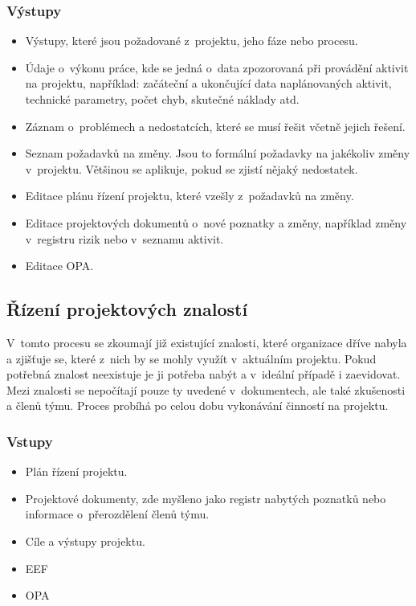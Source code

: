 \subsubsection*{Výstupy}
\begin{itemize}
    \item Výstupy, které jsou požadované z~projektu, jeho fáze nebo procesu.
    \item Údaje o~výkonu práce, kde se jedná o~data zpozorovaná při provádění aktivit na projektu, například: začáteční a ukončující data naplánovaných aktivit, technické parametry, počet chyb, skutečné náklady atd. 
    \item Záznam o~problémech a nedostatcích, které se musí řešit včetně jejich řešení.
    \item Seznam požadavků na změny. Jsou to formální požadavky na jakékoliv změny v~projektu. Většinou se aplikuje, pokud se zjistí nějaký nedostatek.
    \item Editace plánu řízení projektu, které vzešly z~požadavků na změny.
    \item Editace projektových dokumentů o~nové poznatky a změny, například změny v~registru rizik nebo v~seznamu aktivit.
    \item Editace OPA.
\end{itemize}

\subsection*{Řízení projektových znalostí}

V~tomto procesu se zkoumají již existující znalosti, které organizace dříve nabyla a zjišťuje se, které z~nich by se mohly využít v~aktuálním projektu. Pokud potřebná znalost neexistuje je ji potřeba nabýt a v~ideální případě i zaevidovat. Mezi znalosti se nepočítají pouze ty uvedené v~dokumentech, ale také zkušenosti a  členů týmu. Proces probíhá po celou dobu vykonávání činností na projektu.

\subsubsection*{Vstupy}
\begin{itemize}
    \item Plán řízení projektu.
    \item Projektové dokumenty, zde myšleno jako registr nabytých poznatků nebo informace o~přerozdělení členů týmu.
    \item Cíle a výstupy projektu.
    \item EEF
    \item OPA
\end{itemize}
